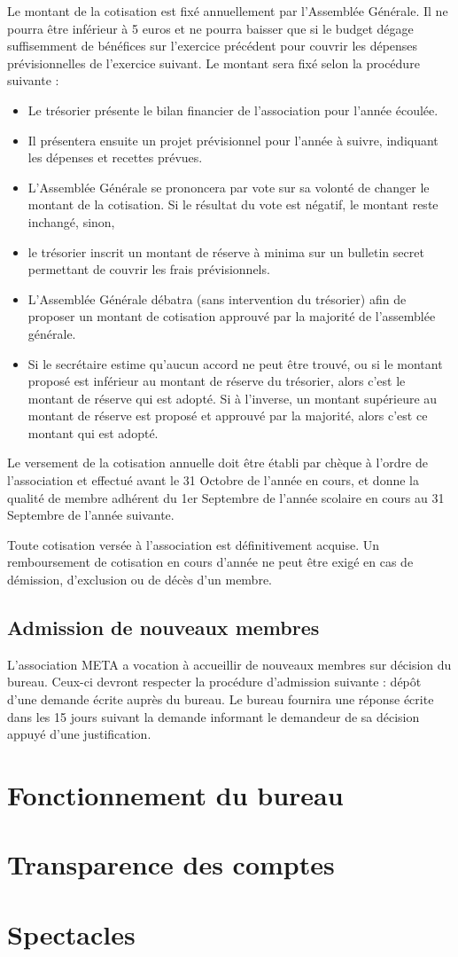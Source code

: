\documentclass[a4paper,french,10pt]{article}
\begin{document}
Le montant de la cotisation est fixé annuellement par l'Assemblée Générale. Il ne pourra être inférieur à 5 euros et ne pourra baisser que si le budget dégage suffisemment de bénéfices sur l'exercice précédent pour couvrir les dépenses prévisionnelles de l'exercice suivant. Le montant sera fixé selon la procédure suivante :
\begin{itemize}
\item Le trésorier présente le bilan financier de l'association pour l'année écoulée.
\item Il présentera ensuite un projet prévisionnel pour l'année à suivre, indiquant les dépenses et recettes prévues.
\item L'Assemblée Générale se prononcera par vote sur sa volonté de changer le montant de la cotisation. Si le résultat du vote est négatif, le montant reste inchangé, sinon,
\item le trésorier inscrit un montant de réserve à minima sur un bulletin secret permettant de couvrir les frais prévisionnels.
\item L'Assemblée Générale débatra (sans intervention du trésorier) afin de proposer un montant de cotisation approuvé par la majorité de l'assemblée générale.
\item Si le secrétaire estime qu'aucun accord ne peut être trouvé, ou si le montant proposé est inférieur au montant de réserve du trésorier, alors c'est le montant de réserve qui est adopté. Si à l'inverse, un montant supérieure au montant de réserve est proposé et approuvé par la majorité, alors c'est ce montant qui est adopté.
\end{itemize}


Le versement de la cotisation annuelle doit être établi par chèque à l'ordre de l'association et effectué avant le 31 Octobre de l'année en cours, et donne la qualité de membre adhérent du 1er Septembre de l'année scolaire en cours au 31 Septembre de l'année suivante.

Toute cotisation versée à l'association est définitivement acquise. Un remboursement de cotisation en cours d'année ne peut être exigé en cas de démission, d'exclusion ou de décès d'un membre.

\subsection{Admission de nouveaux membres}

L'association META a vocation à accueillir de nouveaux membres sur décision du bureau. Ceux-ci devront respecter la procédure d'admission suivante : dépôt d'une demande écrite auprès du bureau. Le bureau fournira une réponse écrite dans les 15 jours suivant la demande informant le demandeur de sa décision appuyé d'une justification.

\section{Fonctionnement du bureau}

\section{Transparence des comptes}
\label{sec:transp-des-compt}



\section{Spectacles}
\label{sec:spectacles}
\end{document}
